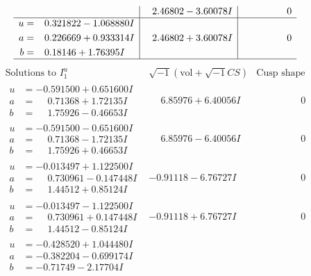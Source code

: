 \documentclass[1p]{elsarticle_modified}
\theoremstyle{definition}
\newcommand{\I}{\sqrt{-1}}
\begin{document}
$$\begin{array}{c|c|c}
 & \phantom{-}2.46802 - 3.60078 I & \phantom{-0.000000 } 0 \\ \hline\begin{aligned}
u &= \phantom{-}0.321822 - 1.068880 I \\
a &= \phantom{-}0.226669 + 0.933314 I \\
b &= \phantom{-}0.18146 + 1.76395 I\end{aligned}
 & \phantom{-}2.46802 + 3.60078 I & \phantom{-0.000000 } 0\\
 \hline 
 \end{array}$$\newpage$$\begin{array}{c|c|c}  
\text{Solutions to }I^u_{1}& \I (\text{vol} + \sqrt{-1}CS) & \text{Cusp shape}\\
 \hline 
\begin{aligned}
u &= -0.591500 + 0.651600 I \\
a &= \phantom{-}0.71368 + 1.72135 I \\
b &= \phantom{-}1.75926 - 0.46653 I\end{aligned}
 & \phantom{-}6.85976 + 6.40056 I & \phantom{-0.000000 } 0 \\ \hline\begin{aligned}
u &= -0.591500 - 0.651600 I \\
a &= \phantom{-}0.71368 - 1.72135 I \\
b &= \phantom{-}1.75926 + 0.46653 I\end{aligned}
 & \phantom{-}6.85976 - 6.40056 I & \phantom{-0.000000 } 0 \\ \hline\begin{aligned}
u &= -0.013497 + 1.122500 I \\
a &= \phantom{-}0.730961 - 0.147448 I \\
b &= \phantom{-}1.44512 + 0.85124 I\end{aligned}
 & -0.91118 - 6.76727 I & \phantom{-0.000000 } 0 \\ \hline\begin{aligned}
u &= -0.013497 - 1.122500 I \\
a &= \phantom{-}0.730961 + 0.147448 I \\
b &= \phantom{-}1.44512 - 0.85124 I\end{aligned}
 & -0.91118 + 6.76727 I & \phantom{-0.000000 } 0 \\ \hline\begin{aligned}
u &= -0.428520 + 1.044480 I \\
a &= -0.382204 - 0.699174 I \\
b &= -0.71749 - 2.17704 I\end{aligned}

\end{array}$$
\end{document}
